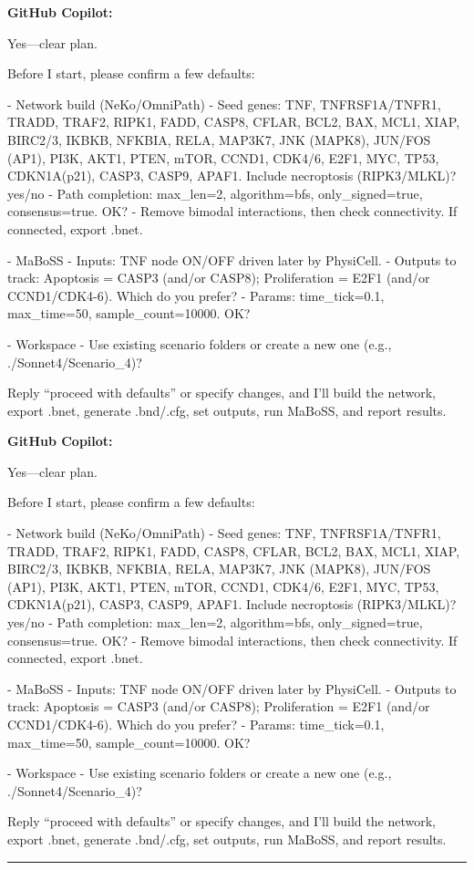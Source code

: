 \documentclass[11pt,a4paper]{article}
\begin{document}
\begin{copilotbox}
\textbf{GitHub Copilot:}

Yes—clear plan.

Before I start, please confirm a few defaults:

- Network build (NeKo/OmniPath)
  - Seed genes: TNF, TNFRSF1A/TNFR1, TRADD, TRAF2, RIPK1, FADD, CASP8, CFLAR, BCL2, BAX, MCL1, XIAP, BIRC2/3, IKBKB, NFKBIA, RELA, MAP3K7, JNK (MAPK8), JUN/FOS (AP1), PI3K, AKT1, PTEN, mTOR, CCND1, CDK4/6, E2F1, MYC, TP53, CDKN1A(p21), CASP3, CASP9, APAF1. Include necroptosis (RIPK3/MLKL)? yes/no
  - Path completion: max\_len=2, algorithm=bfs, only\_signed=true, consensus=true. OK?
  - Remove bimodal interactions, then check connectivity. If connected, export .bnet.

- MaBoSS
  - Inputs: TNF node ON/OFF driven later by PhysiCell.
  - Outputs to track: Apoptosis = CASP3 (and/or CASP8); Proliferation = E2F1 (and/or CCND1/CDK4-6). Which do you prefer?
  - Params: time\_tick=0.1, max\_time=50, sample\_count=10000. OK?

- Workspace
  - Use existing scenario folders or create a new one (e.g., ./Sonnet4/Scenario\_4)?

Reply “proceed with defaults” or specify changes, and I’ll build the network, export .bnet, generate .bnd/.cfg, set outputs, run MaBoSS, and report results.

\end{copilotbox}
\begin{copilotbox}
\textbf{GitHub Copilot:}

Yes—clear plan.

Before I start, please confirm a few defaults:

- Network build (NeKo/OmniPath)
  - Seed genes: TNF, TNFRSF1A/TNFR1, TRADD, TRAF2, RIPK1, FADD, CASP8, CFLAR, BCL2, BAX, MCL1, XIAP, BIRC2/3, IKBKB, NFKBIA, RELA, MAP3K7, JNK (MAPK8), JUN/FOS (AP1), PI3K, AKT1, PTEN, mTOR, CCND1, CDK4/6, E2F1, MYC, TP53, CDKN1A(p21), CASP3, CASP9, APAF1. Include necroptosis (RIPK3/MLKL)? yes/no
  - Path completion: max\_len=2, algorithm=bfs, only\_signed=true, consensus=true. OK?
  - Remove bimodal interactions, then check connectivity. If connected, export .bnet.

- MaBoSS
  - Inputs: TNF node ON/OFF driven later by PhysiCell.
  - Outputs to track: Apoptosis = CASP3 (and/or CASP8); Proliferation = E2F1 (and/or CCND1/CDK4-6). Which do you prefer?
  - Params: time\_tick=0.1, max\_time=50, sample\_count=10000. OK?

- Workspace
  - Use existing scenario folders or create a new one (e.g., ./Sonnet4/Scenario\_4)?

Reply “proceed with defaults” or specify changes, and I’ll build the network, export .bnet, generate .bnd/.cfg, set outputs, run MaBoSS, and report results.

\end{copilotbox}
\bigskip\hrule\bigskip
\end{document}
